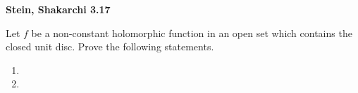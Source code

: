 \textbf{Stein, Shakarchi 3.17}

Let $f$ be a non-constant holomorphic function in an open set which contains the closed unit disc. Prove the following 
statements.

\begin{enumerate}
  \item 
  \pagebreak
  \item 
\end{enumerate}
